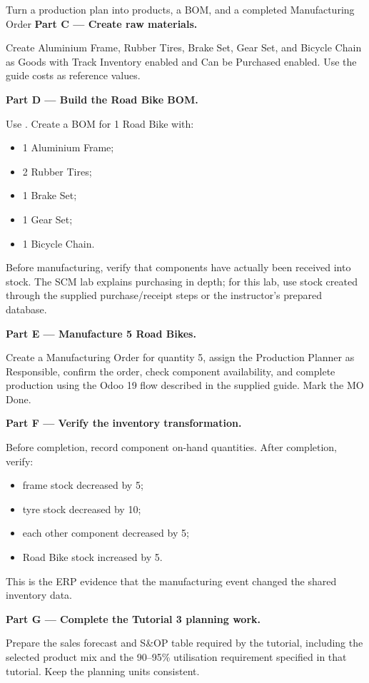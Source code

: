 \begin{labproject}{Turn a production plan into products, a BOM, and a completed Manufacturing Order}
\medskip\noindent\textbf{Part C --- Create raw materials.}

Create Aluminium Frame, Rubber Tires, Brake Set, Gear Set, and Bicycle Chain as Goods with Track Inventory enabled and Can be Purchased enabled. Use the guide costs as reference values.

\medskip\noindent\textbf{Part D --- Build the Road Bike BOM.}

Use . Create a BOM for 1 Road Bike with:
\begin{itemize}
  \item 1 Aluminium Frame;
  \item 2 Rubber Tires;
  \item 1 Brake Set;
  \item 1 Gear Set;
  \item 1 Bicycle Chain.
\end{itemize}

Before manufacturing, verify that components have actually been received into stock. The SCM lab explains purchasing in depth; for this lab, use stock created through the supplied purchase/receipt steps or the instructor's prepared database.

\medskip\noindent\textbf{Part E --- Manufacture 5 Road Bikes.}

Create a Manufacturing Order for quantity 5, assign the Production Planner as Responsible, confirm the order, check component availability, and complete production using the Odoo 19 flow described in the supplied guide. Mark the MO Done.

\medskip\noindent\textbf{Part F --- Verify the inventory transformation.}

Before completion, record component on-hand quantities. After completion, verify:
\begin{itemize}
  \item frame stock decreased by 5;
  \item tyre stock decreased by 10;
  \item each other component decreased by 5;
  \item Road Bike stock increased by 5.
\end{itemize}

This is the ERP evidence that the manufacturing event changed the shared inventory data.

\medskip\noindent\textbf{Part G --- Complete the Tutorial 3 planning work.}

Prepare the sales forecast and S\&OP table required by the tutorial, including the selected product mix and the 90--95\% utilisation requirement specified in that tutorial. Keep the planning units consistent.
\end{labproject}

